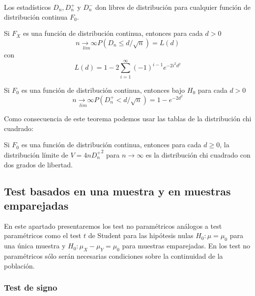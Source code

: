 \begin{teorema}
	Los estadísticos $D_n, D_n^+$ y $D_n^-$ don libres de distribución para cualquier función de distribución continua $F_0$.
\end{teorema}
	
\begin{teorema}
	Si $F_X$ es una función de distribución continua, entonces para cada $d>0$
	\[ \underset{lim}{n \rightarrow \infty}
			P(D_n \leq d/\sqrt{n}) = L(d) \]
	con
	\[ L(d) = 1 - 2 \sum\limits_{i=1}^\infty 
			(-1)^{i-1} e^{-2i^2d^2}	\]
\end{teorema}

\begin{teorema}
	Si $F_0$ es una función de distribución continua, entonces bajo $H_0$ para cada $d>0$
	\[ \underset{lim}{n \rightarrow \infty}
			P(D_n^+ < d/\sqrt{n}) = 1-e^{-2d^2} \]
\end{teorema}	
	Como consecuencia de este teorema podemos usar las tablas de la distribución chi cuadrado:
	
\begin{corolario}
	Si $F_0$ es una función de distribución continua, entonces para cada $d \geq 0$, la distribución límite de $V = 4n {D_n^+}^2$ para $n \rightarrow \infty$ es la distribución chi cuadrado con dos grados de libertad.
\end{corolario}	
	
	
\subsection{Test basados en una muestra y en muestras emparejadas}
	
	En este apartado presentaremos los test no paramétricos análogos a test paramétricos como el test $t$ de Student para las hipótesis nulas $H_0: \mu = \mu_0$ para una única muestra y $H_0: \mu_X - \mu_Y = \mu_0$ para muestras emparejadas. En los test no paramétricos sólo serán necesarias condiciones sobre la continuidad de la población. 
	
\subsubsection{Test de signo}

